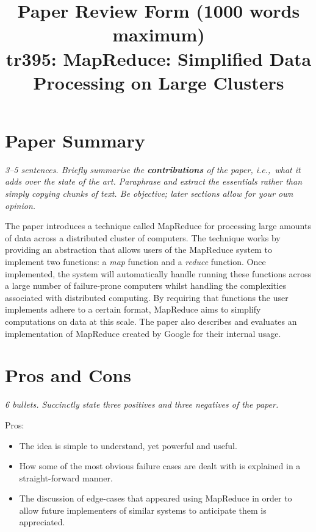 \documentclass[11pt]{article}
\begin{document}

\title{Paper Review Form (1000 words maximum)\\
    tr395: MapReduce: Simplified Data Processing on Large Clusters \cite{MapReduce}}

\maketitle

\section*{Paper Summary}

\textsl{3--5 sentences. Briefly summarise the {\bf contributions} of the paper,
i.e.,~what it adds over the state of the art. Paraphrase and extract the
essentials rather than simply copying chunks of text. Be objective; later
sections allow for your own opinion.}

The paper introduces a technique called MapReduce for processing large amounts
of data across a distributed cluster of computers. The technique works by
providing an abstraction that allows users of the MapReduce system to implement
two functions: a \textit{map} function and a \textit{reduce} function. Once
implemented, the system will automatically handle running these functions
across a large number of failure-prone computers whilst handling the
complexities associated with distributed computing. By requiring that functions
the user implements adhere to a certain format, MapReduce aims to simplify
computations on data at this scale. The paper also describes and evaluates an
implementation of MapReduce created by Google for their internal usage.


\section*{Pros and Cons}

\textsl{6 bullets. Succinctly state three positives and three negatives of the
paper.}

Pros:

\begin{itemize}

    \item The idea is simple to understand, yet powerful and useful.

    \item How some of the most obvious failure cases are dealt with is
    explained in a straight-forward manner.

    \item The discussion of edge-cases that appeared using MapReduce in order
    to allow future implementers of similar systems to anticipate them is
    appreciated.

\end{itemize}
\end{document}
